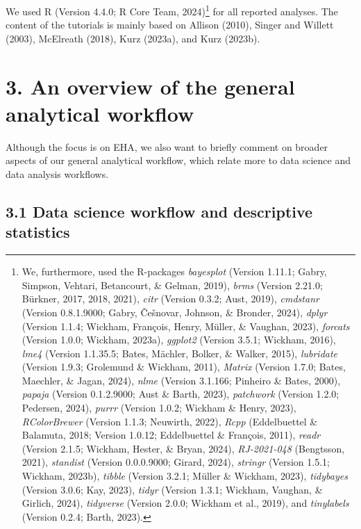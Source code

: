 \documentclass[
  man,floatsintext]{apa6}
\begin{document}
We used R (Version 4.4.0; R Core Team, 2024)\footnote{We, furthermore, used the R-packages \emph{bayesplot} (Version 1.11.1; Gabry, Simpson, Vehtari, Betancourt, \& Gelman, 2019), \emph{brms} (Version 2.21.0; Bürkner, 2017, 2018, 2021), \emph{citr} (Version 0.3.2; Aust, 2019), \emph{cmdstanr} (Version 0.8.1.9000; Gabry, Češnovar, Johnson, \& Bronder, 2024), \emph{dplyr} (Version 1.1.4; Wickham, François, Henry, Müller, \& Vaughan, 2023), \emph{forcats} (Version 1.0.0; Wickham, 2023a), \emph{ggplot2} (Version 3.5.1; Wickham, 2016), \emph{lme4} (Version 1.1.35.5; Bates, Mächler, Bolker, \& Walker, 2015), \emph{lubridate} (Version 1.9.3; Grolemund \& Wickham, 2011), \emph{Matrix} (Version 1.7.0; Bates, Maechler, \& Jagan, 2024), \emph{nlme} (Version 3.1.166; Pinheiro \& Bates, 2000), \emph{papaja} (Version 0.1.2.9000; Aust \& Barth, 2023), \emph{patchwork} (Version 1.2.0; Pedersen, 2024), \emph{purrr} (Version 1.0.2; Wickham \& Henry, 2023), \emph{RColorBrewer} (Version 1.1.3; Neuwirth, 2022), \emph{Rcpp} (Eddelbuettel \& Balamuta, 2018; Version 1.0.12; Eddelbuettel \& François, 2011), \emph{readr} (Version 2.1.5; Wickham, Hester, \& Bryan, 2024), \emph{RJ-2021-048} (Bengtsson, 2021), \emph{standist} (Version 0.0.0.9000; Girard, 2024), \emph{stringr} (Version 1.5.1; Wickham, 2023b), \emph{tibble} (Version 3.2.1; Müller \& Wickham, 2023), \emph{tidybayes} (Version 3.0.6; Kay, 2023), \emph{tidyr} (Version 1.3.1; Wickham, Vaughan, \& Girlich, 2024), \emph{tidyverse} (Version 2.0.0; Wickham et al., 2019), and \emph{tinylabels} (Version 0.2.4; Barth, 2023).} for all reported analyses. The content of the tutorials is mainly based on Allison (2010), Singer and Willett (2003), McElreath (2018), Kurz (2023a), and Kurz (2023b).

\section{3. An overview of the general analytical workflow}\label{an-overview-of-the-general-analytical-workflow}

Although the focus is on EHA, we also want to briefly comment on broader aspects of our general analytical workflow, which relate more to data science and data analysis workflows.

\subsection{3.1 Data science workflow and descriptive statistics}\label{data-science-workflow-and-descriptive-statistics}
\end{document}
